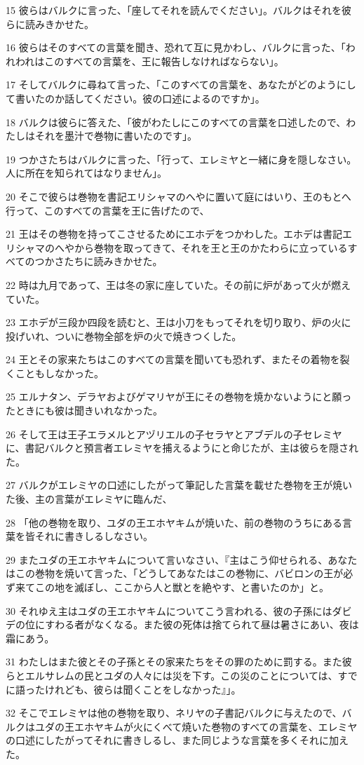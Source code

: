 \par 15 彼らはバルクに言った、「座してそれを読んでください」。バルクはそれを彼らに読みきかせた。
\par 16 彼らはそのすべての言葉を聞き、恐れて互に見かわし、バルクに言った、「われわれはこのすべての言葉を、王に報告しなければならない」。
\par 17 そしてバルクに尋ねて言った、「このすべての言葉を、あなたがどのようにして書いたのか話してください。彼の口述によるのですか」。
\par 18 バルクは彼らに答えた、「彼がわたしにこのすべての言葉を口述したので、わたしはそれを墨汁で巻物に書いたのです」。
\par 19 つかさたちはバルクに言った、「行って、エレミヤと一緒に身を隠しなさい。人に所在を知られてはなりません」。
\par 20 そこで彼らは巻物を書記エリシャマのへやに置いて庭にはいり、王のもとへ行って、このすべての言葉を王に告げたので、
\par 21 王はその巻物を持ってこさせるためにエホデをつかわした。エホデは書記エリシャマのへやから巻物を取ってきて、それを王と王のかたわらに立っているすべてのつかさたちに読みきかせた。
\par 22 時は九月であって、王は冬の家に座していた。その前に炉があって火が燃えていた。
\par 23 エホデが三段か四段を読むと、王は小刀をもってそれを切り取り、炉の火に投げいれ、ついに巻物全部を炉の火で焼きつくした。
\par 24 王とその家来たちはこのすべての言葉を聞いても恐れず、またその着物を裂くこともしなかった。
\par 25 エルナタン、デラヤおよびゲマリヤが王にその巻物を焼かないようにと願ったときにも彼は聞きいれなかった。
\par 26 そして王は王子エラメルとアヅリエルの子セラヤとアブデルの子セレミヤに、書記バルクと預言者エレミヤを捕えるようにと命じたが、主は彼らを隠された。
\par 27 バルクがエレミヤの口述にしたがって筆記した言葉を載せた巻物を王が焼いた後、主の言葉がエレミヤに臨んだ、
\par 28 「他の巻物を取り、ユダの王エホヤキムが焼いた、前の巻物のうちにある言葉を皆それに書きしるしなさい。
\par 29 またユダの王エホヤキムについて言いなさい、『主はこう仰せられる、あなたはこの巻物を焼いて言った、「どうしてあなたはこの巻物に、バビロンの王が必ず来てこの地を滅ぼし、ここから人と獣とを絶やす、と書いたのか」と。
\par 30 それゆえ主はユダの王エホヤキムについてこう言われる、彼の子孫にはダビデの位にすわる者がなくなる。また彼の死体は捨てられて昼は暑さにあい、夜は霜にあう。
\par 31 わたしはまた彼とその子孫とその家来たちをその罪のために罰する。また彼らとエルサレムの民とユダの人々には災を下す。この災のことについては、すでに語ったけれども、彼らは聞くことをしなかった』」。
\par 32 そこでエレミヤは他の巻物を取り、ネリヤの子書記バルクに与えたので、バルクはユダの王エホヤキムが火にくべて焼いた巻物のすべての言葉を、エレミヤの口述にしたがってそれに書きしるし、また同じような言葉を多くそれに加えた。

